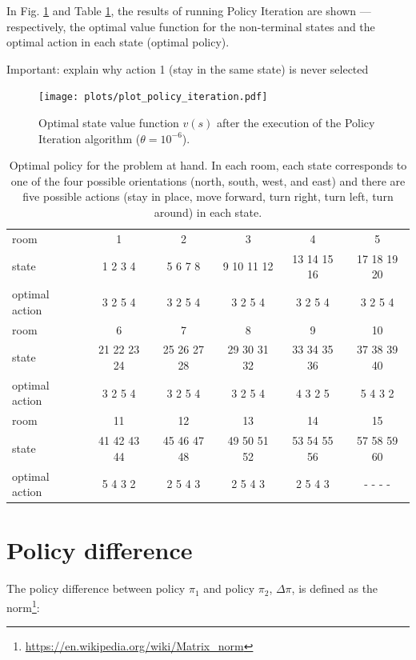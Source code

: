 \documentclass[a4paper]{article}
\begin{document}
In Fig. \ref{fig:policy_iteration} and Table \ref{tab:optimal_policy}, the results of running Policy Iteration are shown --- respectively, the optimal value function for the non-terminal states and the optimal action in each state (optimal policy).

Important: explain why action 1 (stay in the same state) is never selected

\begin{figure}[htbp]
\centering
\texttt{[image: plots/plot\_policy\_iteration.pdf]}
\caption{Optimal state value function $v(s)$ after the execution of the Policy Iteration algorithm ($\theta=10^{-6}$).}
\label{fig:policy_iteration}
\end{figure}

\begin{table}[htbp]
\centering
\begin{tabular}{| p{1cm} | c c c c c |} 
 \hline
 room & 1 & 2 & 3 & 4 & 5 \\ %
 state & 1 2 3 4 & 5 6 7 8 & 9 10 11 12 & 13 14 15 16 & 17 18 19 20 \\
 \hline
 optimal action & 3 2 5 4 & 3 2 5 4 & 3 2 5 4 & 3 2 5 4 & 3 2 5 4 \\ 
 \hline\hline
 room & 6 & 7 & 8 & 9 & 10 \\ %
 state & 21 22 23 24 & 25 26 27 28 & 29 30 31 32 & 33 34 35 36 & 37 38 39 40 \\ %
 \hline
 optimal action & 3 2 5 4 & 3 2 5 4 & 3 2 5 4 & 4 3 2 5 & 5 4 3 2 \\ [1ex]
 \hline\hline
 room & 11 & 12 & 13 & 14 & 15\\ %
 state & 41 42 43 44 & 45 46 47 48 & 49 50 51 52 & 53 54 55 56 & 57 58 59 60\\ %
 \hline
 optimal action & 5 4 3 2 & 2 5 4 3 & 2 5 4 3 & 2 5 4 3 & - - - -\\ [1ex]
 \hline
\end{tabular}
\caption{Optimal policy for the problem at hand. In each room, each state corresponds to one of the four possible orientations (north, south, west, and east) and there are five possible actions (stay in place, move forward, turn right, turn left, turn around) in each state.}
\label{tab:optimal_policy}
\end{table}


\vfill
\newpage
\section{Policy difference}
\label{app_sec:policy_difference}
The policy difference between policy $\pi_1$ and policy $\pi_2$, $\Delta \pi$, is defined as the norm\footnote{\url{https://en.wikipedia.org/wiki/Matrix_norm}}:
\end{document}
